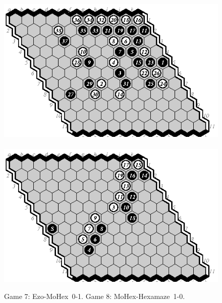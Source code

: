 \documentclass{icga}
\def\Eo{\mbox{\sc Ezo}}
\def\Hz{\mbox{\sc Hexamaze}}
\def\Mx{\mbox{\sc MoHex}}
\begin{document}
\begin{figure}[hbp]
\includegraphics[scale=1.3]{games/pix/07-em-0-1.eps}\hspace*{-1cm}\
\includegraphics[scale=1.3]{games/pix/08-mh-1-0.eps}
\caption{Game 7: \Eo-\Mx\ 0-1. Game 8: \Mx-\Hz\ 1-0.}
\end{figure}
\end{document}
